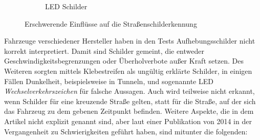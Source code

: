 \begin{figure}[H]
\begin{subfigure}[b]{0.125\textwidth}
    \caption{LED Schilder}
    \label{fig:ledschild}
   \end{subfigure}
      \caption{Erschwerende Einflüsse auf die Straßenschilderkennung \cite{GTSRB}}
      \label{fig:einfluesse-strscherkennung}
\end{figure}

Fahrzeuge verschiedener Hersteller haben in den Tests Aufhebungsschilder nicht korrekt interpretiert. Damit sind Schilder gemeint, die entweder Geschwindigkeitsbegrenzungen oder Überholverbote außer Kraft setzen. Des Weiteren sorgten mittels Klebestreifen als ungültig erklärte Schilder, in einigen Fällen Dunkelheit, beispielsweise in Tunneln, und sogenannte LED \emph{Wechselverkehrszeichen} für falsche Aussagen. Auch wird teilweise nicht erkannt, wenn Schilder für eine kreuzende Straße gelten, statt für die Straße, auf der sich das Fahrzeug zu dem gebenen Zeitpunkt befinden. Weitere Aspekte, die in dem Artikel nicht explizit genannt sind, aber laut einer Publikation von 2014 in der Vergangenheit zu Schwierigkeiten geführt haben, sind mitunter die folgenden: \cite{traffic-sign-detection-review-2014}

